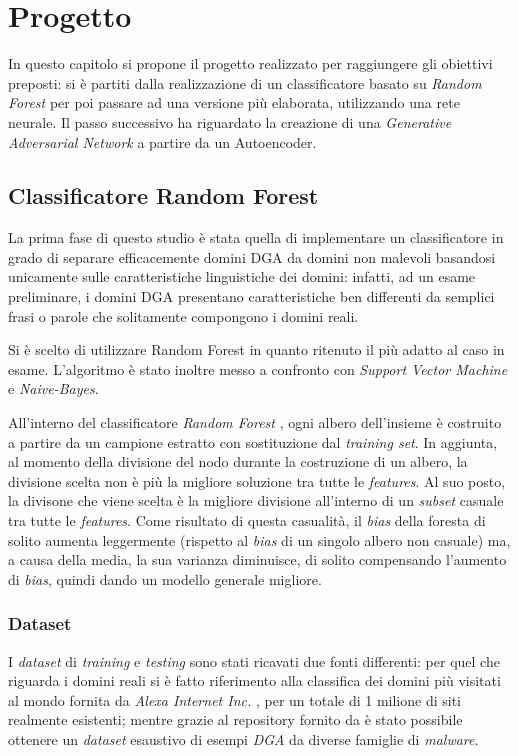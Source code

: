 \chapter{Progetto}
\label{progetto}

In questo capitolo si propone il progetto realizzato per raggiungere gli obiettivi preposti: si è partiti dalla realizzazione di un classificatore basato su \textit{Random Forest} per poi passare ad una versione più elaborata, utilizzando una rete neurale. Il passo successivo ha riguardato la creazione di una \textit{Generative Adversarial Network} a partire da un Autoencoder.  


\section{Classificatore Random Forest}
\label{randomforest}
La prima fase di questo studio è stata quella di implementare un classificatore in grado di separare efficacemente domini DGA da domini non malevoli basandosi unicamente sulle caratteristiche linguistiche dei domini: infatti, ad un esame preliminare, i domini DGA presentano caratteristiche ben differenti da semplici frasi o parole che solitamente compongono i domini reali.

Si è scelto di utilizzare Random Forest in quanto ritenuto il più adatto al caso in esame. L'algoritmo è stato inoltre messo a confronto con \textit{Support Vector Machine} e \textit{Naive-Bayes}.

All'interno del classificatore \textit{Random Forest} \cite{randomforest}, ogni albero dell'insieme è costruito a partire da un campione estratto con sostituzione dal \textit{training set}. In aggiunta, al momento della divisione del nodo durante la costruzione di un albero, la divisione scelta non è più la migliore soluzione tra tutte le \textit{features}. Al suo posto, la divisone che viene scelta è la migliore divisione all'interno di un \textit{subset} casuale tra tutte le \textit{features}. Come risultato di questa casualità, il \textit{bias} della foresta di solito aumenta leggermente (rispetto al \textit{bias} di un singolo albero non casuale) ma, a causa della media, la sua varianza diminuisce, di solito compensando l'aumento di \textit{bias}, quindi dando un modello generale migliore.

\subsection{Dataset}
\label{randomforestinput}
I \textit{dataset} di \textit{training} e \textit{testing} sono stati ricavati due fonti differenti: per quel che riguarda i domini reali si è fatto riferimento alla classifica dei domini più visitati al mondo fornita da \textit{Alexa Internet Inc.} \cite{amazon:alexa} , per un totale di 1 milione di siti realmente esistenti; mentre grazie al repository fornito da \cite{github:dgarepo} è stato possibile ottenere un \textit{dataset} esaustivo di esempi \textit{DGA} da diverse famiglie di \textit{malware}.

